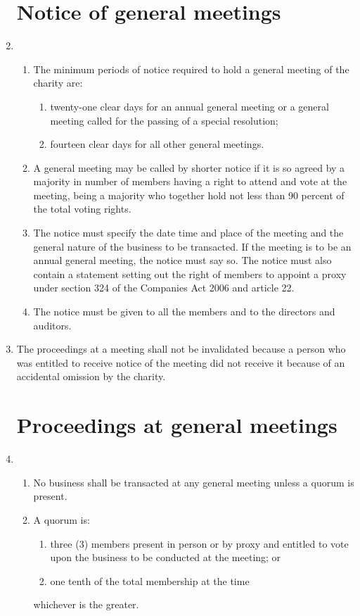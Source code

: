\documentclass{article}
\begin{document}
\begin{enumerate}[label=\arabic*]
    \section{Notice of general meetings}
    \item \begin{enumerate}[label=(\arabic*)]
        \item The minimum periods of notice required to hold a general
        meeting of the charity are:
        \begin{enumerate}[label=(\alph*)]
            \item twenty-one clear days for an annual general meeting
            or a general meeting called for the passing of a
            special resolution;
            \item fourteen clear days for all other general meetings.
        \end{enumerate}
        \item A general meeting may be called by shorter notice if it is so
        agreed by a majority in number of members having a right to
        attend and vote at the meeting, being a majority who together
        hold not less than 90 percent of the total voting rights.
        \item The notice must specify the date time and place of the meeting
        and the general nature of the business to be transacted. If the
        meeting is to be an annual general meeting, the notice must
        say so. The notice must also contain a statement setting out the
        right of members to appoint a proxy under section 324 of the
        Companies Act 2006 and article 22.
        \item  The notice must be given to all the members and to the
        directors and auditors.
    \end{enumerate}
    \item The proceedings at a meeting shall not be invalidated because a person
    who was entitled to receive notice of the meeting did not receive it
    because of an accidental omission by the charity.
    
    \section{Proceedings at general meetings}
    \item \begin{enumerate}[label=(\arabic*)]
        \item No business shall be transacted at any general meeting unless a
        quorum is present.
        \item A quorum is:
        \begin{enumerate}[label=(\alph*)]
            \item three (3) members present in person or by proxy and entitled to
            vote upon the business to be conducted at the meeting; or
            \item one tenth of the total membership at the time
        \end{enumerate}
        whichever is the greater.
        

\end{enumerate}
\end{enumerate}
\end{document}
